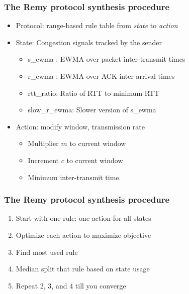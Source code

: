 \begin{frame}[noframenumbering]
\frametitle{The Remy protocol synthesis procedure}
\begin{itemize}
\item<1-> Protocol: range-based rule table from \textit{state} to \textit{action}
\item<2-> State: Congestion signals tracked by the sender
\begin{itemize}
\item s\_ewma : EWMA over packet inter-transmit times
\item r\_ewma : EWMA over ACK inter-arrival times
\item rtt\_ratio: Ratio of RTT to minimum RTT
\item slow\_r\_ewma: Slower version of s\_ewma
\end{itemize}
\item<3-> Action: modify window, transmission rate
\begin{itemize}
\item Multiplier $m$ to current window
\item Increment $c$ to current window
\item Minimum inter-transmit time.
\end{itemize}
\end{itemize}
\end{frame}

\begin{frame}[noframenumbering]
\frametitle{The Remy protocol synthesis procedure}
\begin{enumerate}
\item Start with one rule: one action for all states
\item Optimize each action to maximize objective
\item Find most used rule
\item Median split that rule based on state usage
\item Repeat 2, 3, and 4 till you converge
\end{enumerate}
\end{frame}

